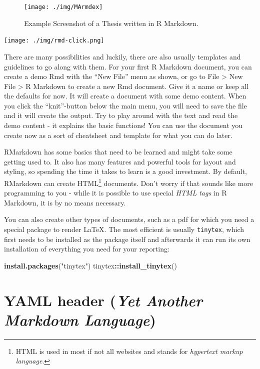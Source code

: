 \documentclass[
]{book}
\newenvironment{Shaded}{\begin{snugshade}}{\end{snugshade}}
\newcommand{\FunctionTok}[1]{\textcolor[rgb]{0.13,0.29,0.53}{\textbf{#1}}}
\newcommand{\NormalTok}[1]{#1}
\newcommand{\SpecialCharTok}[1]{\textcolor[rgb]{0.81,0.36,0.00}{\textbf{#1}}}
\newcommand{\StringTok}[1]{\textcolor[rgb]{0.31,0.60,0.02}{#1}}
\begin{document}
\begin{figure}
\texttt{[image: ./img/MArmdex]} \caption{Example Screenshot of a Thesis written in R Markdown.}\label{fig:maexample}
\end{figure}

\texttt{[image: ./img/rmd-click.png]}

There are many possibilities and luckily, there are also usually templates and guidelines to go along with them.
For your first R Markdown document, you can create a demo Rmd with the ``New File'' menu as shown, or go to File \textgreater{} New File \textgreater{} R Markdown to create a new Rmd document.
Give it a name or keep all the defaults for now.
It will create a document with some demo content.
When you click the ``knit''-button below the main menu, you will need to save the file and it will create the output.
Try to play around with the text and read the demo content - it explains the basic functions!
You can use the document you create now as a sort of cheatsheet and template for what you can do later.

RMarkdown has some basics that need to be learned and might take some getting used to.
It also has many features and powerful tools for layout and styling, so spending the time it takes to learn is a good investment.
By default, RMarkdown can create HTML\footnote{HTML is used in most if not all websites and stands for \emph{hypertext markup language}.} documents.
Don't worry if that sounds like more programming to you - while it is possible to use special \emph{HTML tags} in R Markdown, it is by no means necessary.

You can also create other types of documents, such as a pdf for which you need a special package to render \LaTeX.
The most efficient is usually \texttt{tinytex}, which first needs to be installed as the package itself and afterwards it can run its own installation of everything you need for your reporting:

\begin{Shaded}
\begin{Highlighting}[]
\FunctionTok{install.packages}\NormalTok{(}\StringTok{"tinytex"}\NormalTok{)}
\NormalTok{tinytex}\SpecialCharTok{::}\FunctionTok{install\_tinytex}\NormalTok{()}
\end{Highlighting}
\end{Shaded}

\section{\texorpdfstring{YAML header (\emph{Yet Another Markdown Language})}{YAML header (Yet Another Markdown Language)}}\label{yaml-header-yet-another-markdown-language}
\end{document}
